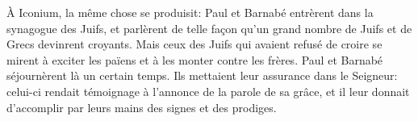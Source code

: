 À Iconium, la même chose se produisit:
	Paul et Barnabé entrèrent dans la synagogue des Juifs,
	et parlèrent de telle façon
		qu’un grand nombre de Juifs et de Grecs devinrent croyants.
Mais ceux des Juifs qui avaient refusé de croire
	se mirent à exciter les païens et à les monter contre les frères.
Paul et Barnabé séjournèrent là un certain temps.
Ils mettaient leur assurance dans le Seigneur:
	celui-ci rendait témoignage à l’annonce de la parole de sa grâce,
	et il leur donnait d’accomplir par leurs mains des signes et des prodiges.
